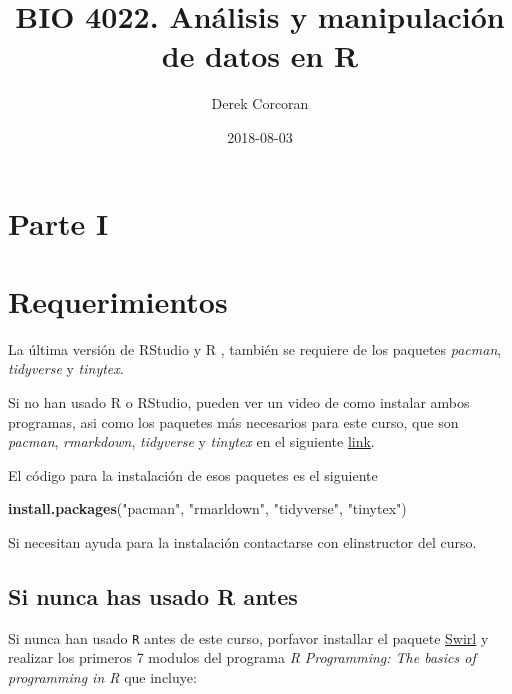 \documentclass[]{book}
\title{BIO 4022. Análisis y manipulación de datos en R}
\author{Derek Corcoran}
\date{2018-08-03}
\newenvironment{Shaded}{\begin{snugshade}}{\end{snugshade}}
\newcommand{\KeywordTok}[1]{\textcolor[rgb]{0.13,0.29,0.53}{\textbf{#1}}}
\newcommand{\NormalTok}[1]{#1}
\newcommand{\StringTok}[1]{\textcolor[rgb]{0.31,0.60,0.02}{#1}}
\begin{document}
\maketitle

{
\setcounter{tocdepth}{1}
\tableofcontents
}
\hypertarget{parte-i}{%
\chapter*{Parte I}\label{parte-i}}

\hypertarget{requerimientos}{%
\chapter{Requerimientos}\label{requerimientos}}

La última versión de RStudio y R \citep{R-base}, también se requiere de
los paquetes \emph{pacman}, \emph{tidyverse} y \emph{tinytex}.

Si no han usado R o RStudio, pueden ver un video de como instalar ambos
programas, asi como los paquetes más necesarios para este curso, que son
\emph{pacman}, \emph{rmarkdown}, \emph{tidyverse} y \emph{tinytex} en el
siguiente \href{https://youtu.be/RtkCAKXsVbw}{link}.

El código para la instalación de esos paquetes es el siguiente

\begin{Shaded}
\begin{Highlighting}[]
\KeywordTok{install.packages}\NormalTok{(}\StringTok{"pacman"}\NormalTok{, }\StringTok{"rmarldown"}\NormalTok{, }\StringTok{"tidyverse"}\NormalTok{, }\StringTok{"tinytex"}\NormalTok{)}
\end{Highlighting}
\end{Shaded}

Si necesitan ayuda para la instalación contactarse con elinstructor del
curso.

\hypertarget{si-nunca-has-usado-r-antes}{%
\section{Si nunca has usado R antes}\label{si-nunca-has-usado-r-antes}}

Si nunca han usado \texttt{R} antes de este curso, porfavor installar el
paquete \href{http://swirlstats.com/students.html}{Swirl}
\citep{Kross2017} y realizar los primeros 7 modulos del programa \emph{R
Programming: The basics of programming in R} que incluye:
\end{document}
